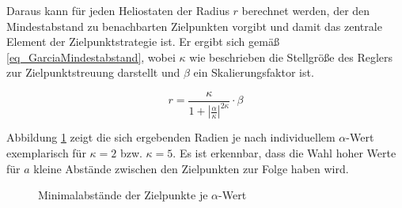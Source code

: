 Daraus kann für jeden Heliostaten der Radius $r$ berechnet werden, der den Mindestabstand zu benachbarten Zielpunkten vorgibt und damit das zentrale Element der Zielpunktstrategie ist.
Er ergibt sich gemäß \ref{eq_GarciaMindestabstand}, wobei $\kappa$ wie beschrieben die Stellgröße des Reglers zur Zielpunktstreuung darstellt und $\beta$ ein Skalierungsfaktor ist.

\begin{equation} \label{eq_GarciaMindestabstand}
    r=\frac{\kappa}{1+\left|\frac{\alpha}{\kappa}\right|^{2\kappa}}\cdot\beta
\end{equation}

Abbildung \ref{fig_Verteilunglpha} zeigt die sich ergebenden Radien je nach individuellem $\alpha$-Wert exemplarisch für $\kappa=2$ bzw. $\kappa=5$.
Es ist erkennbar, dass die Wahl hoher Werte für $a$ kleine Abstände zwischen den Zielpunkten zur Folge haben wird.

\begin{figure}[h!]
    \centering
    \setlength{\fboxsep}{1pt}
    \setlength{\fboxrule}{1pt}
    \caption[Minimalabstände der Zielpunkte je $\alpha$-Wert]{Minimalabstände der Zielpunkte je $\alpha$-Wert \cite[S.9]{Garcia2}}
    \label{fig_Verteilunglpha}
\end{figure}

